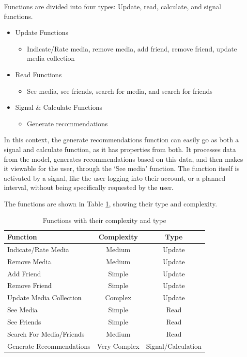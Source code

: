 Functions are divided into four types: Update, read, calculate, and signal functions.
\begin{itemize}
	\item Update Functions
	\begin{itemize}
		\item Indicate/Rate media, remove media, add friend, remove friend, update media collection
	\end{itemize}
	\item Read Functions
	\begin{itemize}
		\item See media, see friends, search for media, and search for friends
	\end{itemize}
	\item Signal \& Calculate Functions
	\begin{itemize}
		\item Generate recommendations
	\end{itemize}
\end{itemize}

In this context, the generate recommendations function can easily go as both a signal and calculate function, as it has properties from both. It processes data from the model, generates recommendations based on this data, and then makes it viewable for the user, through the ‘See media’ function. The function itself is activated by a signal, like the user logging into their account, or a planned interval, without being specifically requested by the user.

The functions are shown in Table \ref{FuncTable}, showing their type and complexity.

\begin{table}[htb]
\centering
\begin{tabular}{|l|c|c|} \hline
	 \textbf{Function} & \textbf{Complexity} & \textbf{Type} \\ \hline
	Indicate/Rate Media & Medium & Update \\ \hline
	Remove Media & Medium & Update \\ \hline
	Add Friend & Simple & Update \\ \hline
	Remove Friend & Simple & Update \\ \hline
	Update Media Collection & Complex & Update \\ \hline
	See Media & Simple & Read \\ \hline
	See Friends & Simple & Read \\ \hline
	Search For Media/Friends & Medium & Read \\ \hline
	Generate Recommendations & Very Complex & Signal/Calculation \\ \hline
\end{tabular}
\caption{Functions with their complexity and type}
\label{FuncTable}
\end{table}